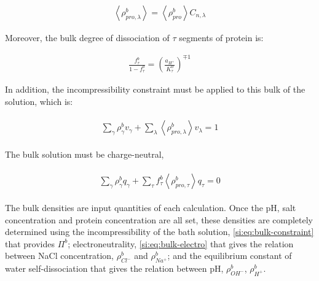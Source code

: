 \documentclass[journal=jacsat,manuscript=suppinfo]{achemso}
\begin{document}
\begin{align}
	\left<\rho^b_{pro,\lambda}\right> =  \left<\rho^b_{pro}\right> C_{n,\lambda}
	\label{eq:segments_pro_si}
\end{align}






Moreover, the bulk degree of dissociation  of $\tau$ segments of protein is:

\begin{align}
	\frac{f_\tau^b}{1-f_\tau^b} = \left(\frac{a_{H^+}}{K^0_{\tau}}\right)^{\mp 1}
\end{align}







In addition, the  incompressibility constraint must be applied to this bulk of the solution, which is:

\begin{align}
	\begin{aligned}
		{\sum_{\gamma}\rho^b_\gamma v_\gamma + \sum_\lambda{\left<\rho^b_{pro,\lambda}\right>v_\lambda} } =1
	\end{aligned}
	\label{si:eq:bulk-constraint}
\end{align}



The bulk solution must  be charge-neutral,

\begin{align}
	\begin{aligned}
		{\sum_{\gamma}\rho^b_\gamma q_\gamma + \sum_\tau{f_\tau^b \left<\rho^b_{pro,\tau}\right>q_\tau} } =0
	\end{aligned}
	\label{si:eq:bulk-electro}
\end{align}






The bulk densities are  input quantities  of each calculation.
Once the pH, salt concentration and protein concentration are all set, these densities are completely determined using the incompressibility of the bath solution, \cref{si:eq:bulk-constraint} that provides $\Pi^b$; electroneutrality, \cref{si:eq:bulk-electro} that gives the relation between NaCl concentration, $\rho_{Cl^-}^b$ and $\rho_{Na^+}^b$;  and the equilibrium constant of water self-dissociation that gives the relation between pH, $\rho_{OH^-}^b$, $\rho_{H^+}^b$.
\end{document}
